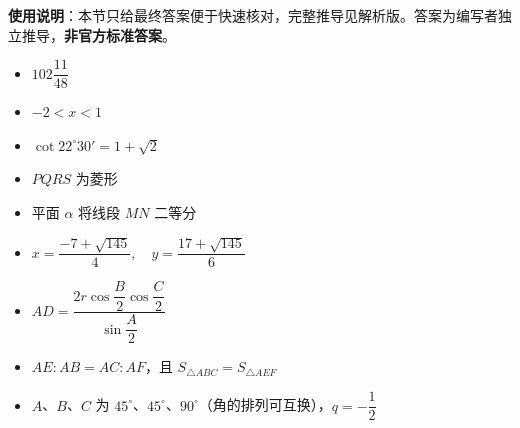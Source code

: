 
\begin{gknotice}
\textbf{使用说明}：本节只给最终答案便于快速核对，完整推导见解析版。答案为编写者独立推导，\textbf{非官方标准答案}。
\end{gknotice}

\begin{itemize}[leftmargin=2.6em]
  \item[\textbf{1.}] $102\dfrac{11}{48}$
  \item[\textbf{2.}] $-2<x<1$
  \item[\textbf{3.}] $\cot22^\circ30'=1+\sqrt2$
  \item[\textbf{4.}] $PQRS$ 为菱形
  \item[\textbf{5.}] 平面 $\alpha$ 将线段 $MN$ 二等分
\end{itemize}

\begin{itemize}[leftmargin=2.6em]
  \item[\textbf{6.}] $x=\dfrac{-7+\sqrt{145}}4,\quad y=\dfrac{17+\sqrt{145}}6$
  \item[\textbf{7.}] $AD=\dfrac{2r\cos\dfrac B2\cos\dfrac C2}{\sin\dfrac A2}$
  \item[\textbf{8.}] $AE:AB=AC:AF$，且 $S_{\triangle ABC}=S_{\triangle AEF}$
  \item[\textbf{9.}] $A$、$B$、$C$ 为 $45^\circ$、$45^\circ$、$90^\circ$（角的排列可互换），$q=-\dfrac12$
\end{itemize}
